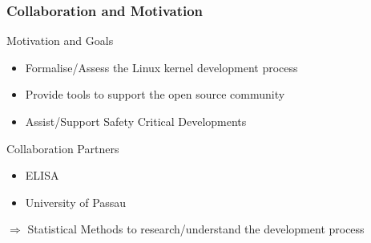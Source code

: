 \documentclass{beamer}
\begin{document}

	\begin{frame}
	\frametitle{Collaboration and Motivation}
		\begin{block}{Motivation and Goals}
			\begin{itemize}
				\item Formalise/Assess the Linux kernel development process
				\item Provide tools to support the open source community
				\item Assist/Support Safety Critical Developments
			\end{itemize}
		\end{block}
		\begin{block}{Collaboration Partners}
			\begin{itemize}
				\item ELISA
				\item University of Passau
			\end{itemize}
		\end{block}
		$\Rightarrow$ Statistical Methods to research/understand the development process
	\end{frame}

\end{document}

